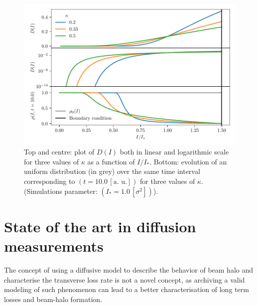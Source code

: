 \begin{figure}[htp]
    \centering
    \includegraphics[width=\textwidth]{4_probing_the_diffusive_behavior/figs/diffusion_coefficient.pdf}
    \caption{Top and centre: plot of $D(I)$ both in linear and logarithmic scale for three values of $\kappa$ as a function of $I/I_\ast$.
    Bottom: evolution of an uniform distribution (in grey) over the same time interval corresponding to $(t=10.0 \, [\text{a. u.}])$ for three values of $\kappa$. (Simulations parameter: $(I_\ast = 1.0\,[\sigma^2])$).}
    \label{fig:1}
\end{figure}

\section{State of the art in diffusion measurements}

The concept of using a diffusive model to describe the behavior of beam halo and characterise the transverse loss rate is not a novel concept, as archiving a valid modeling of such phenomenon can lead to a better characterisation of long term losses and beam-halo formation.

